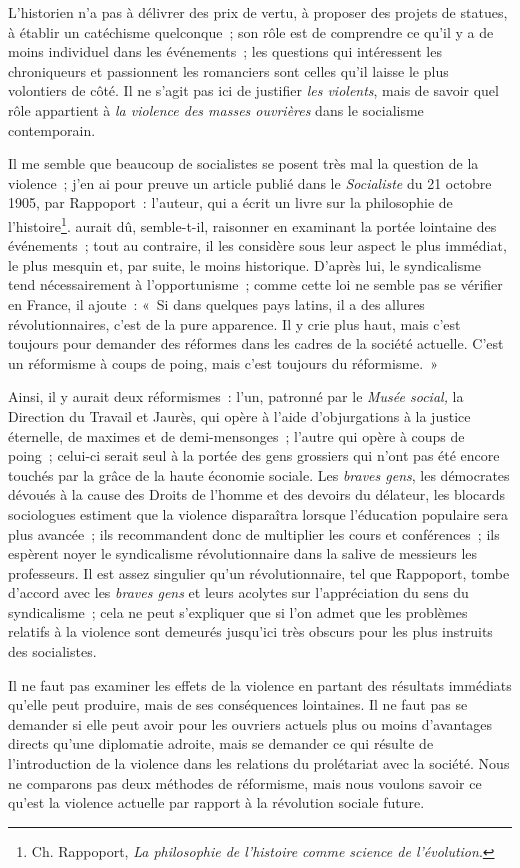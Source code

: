 \documentclass[french,twoside]{book} %
\begin{document}
\noindent L’historien n’a pas à délivrer des prix de vertu, à proposer des projets de statues, à établir un catéchisme quelconque ; son rôle est de comprendre ce qu’il y a de moins individuel dans les événements ; les questions qui intéressent les chroniqueurs et passionnent les romanciers sont celles qu’il laisse le plus volontiers de côté. Il ne s’agit pas ici de justifier \emph{les violents}, mais de savoir quel rôle appartient à \emph{la violence des masses ouvrières} dans le socialisme contemporain.\par
Il me semble que beaucoup de socialistes se posent très mal la question de la violence ; j’en ai pour preuve un article publié dans le \emph{Socialiste} du 21 octobre 1905, par Rappoport : l’auteur, qui a écrit un livre sur la philosophie  de l’histoire\footnote{ \noindent Ch. Rappoport, \emph{La philosophie de l’histoire comme science de l’évolution}.
 }. aurait dû, semble-t-il, raisonner en examinant la portée lointaine des événements ; tout au contraire, il les considère sous leur aspect le plus immédiat, le plus mesquin et, par suite, le moins historique. D’après lui, le syndicalisme tend nécessairement à l’opportunisme ; comme cette loi ne semble pas se vérifier en France, il ajoute : « Si dans quelques pays latins, il a des allures révolutionnaires, c’est de la pure apparence. Il y crie plus haut, mais c’est toujours pour demander des réformes dans les cadres de la société actuelle. C’est un réformisme à coups de poing, mais c’est toujours du réformisme. »\par
Ainsi, il y aurait deux réformismes : l’un, patronné par le \emph{Musée social,} la Direction du Travail et Jaurès, qui opère à l’aide d’objurgations à la justice éternelle, de maximes et de demi-mensonges ; l’autre qui opère à coups de poing ; celui-ci serait seul à la portée des gens grossiers qui n’ont pas été encore touchés par la grâce de la haute économie sociale. Les \emph{braves gens}, les démocrates dévoués à la cause des Droits de l’homme et des devoirs du délateur, les blocards sociologues estiment que la violence disparaîtra lorsque l’éducation populaire sera plus avancée ; ils recommandent donc de multiplier les cours et conférences ; ils espèrent noyer le syndicalisme révolutionnaire dans la salive de messieurs les professeurs. Il est assez singulier qu’un révolutionnaire, tel que Rappoport, tombe d’accord avec les \emph{braves gens} et leurs acolytes sur l’appréciation du sens du syndicalisme ; cela ne peut s’expliquer  que si l’on admet que les problèmes relatifs à la violence sont demeurés jusqu’ici très obscurs pour les plus instruits des socialistes.\par
Il ne faut pas examiner les effets de la violence en partant des résultats immédiats qu’elle peut produire, mais de ses conséquences lointaines. Il ne faut pas se demander si elle peut avoir pour les ouvriers actuels plus ou moins d’avantages directs qu’une diplomatie adroite, mais se demander ce qui résulte de l’introduction de la violence dans les relations du prolétariat avec la société. Nous ne comparons pas deux méthodes de réformisme, mais nous voulons savoir ce qu’est la violence actuelle par rapport à la révolution sociale future.\par
\end{document}
